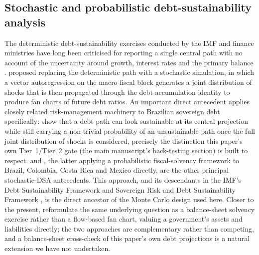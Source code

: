 \documentclass[11pt,a4paper]{article}
\begin{document}
\subsection{Stochastic and probabilistic debt-sustainability analysis}
\label{sec:lit-dsa}

The deterministic debt-sustainability exercises conducted by the IMF and finance ministries have long been criticised for reporting a single central path with no account of the uncertainty around growth, interest rates and the primary balance \citep{imf2003dsa}. \citet{celasundebrunostry2007} proposed replacing the deterministic path with a stochastic simulation, in which a vector autoregression on the macro-fiscal block generates a joint distribution of shocks that is then propagated through the debt-accumulation identity to produce fan charts of future debt ratios. An important direct antecedent applies closely related risk-management machinery to Brazilian sovereign debt specifically: \citet{garciarigobon2004} show that a debt path can look sustainable at its central projection while still carrying a non-trivial probability of an unsustainable path once the full joint distribution of shocks is considered, precisely the distinction this paper's own Tier~1/Tier~2 gate (the main manuscript's back-testing section) is built to respect. \citet{karamhostland2005,karamhostland2006} and \citet{mendozaoviedo2004}, the latter applying a probabilistic fiscal-solvency framework to Brazil, Colombia, Costa Rica and Mexico directly, are the other principal stochastic-DSA antecedents. This approach, and its descendants in the IMF's Debt Sustainability Framework \citep{imf2013mac} and Sovereign Risk and Debt Sustainability Framework \citep{imf2022srdsf}, is the direct ancestor of the Monte Carlo design used here. Closer to the present, \citet{levyyeyatisturzenegger2023} reformulate the same underlying question as a balance-sheet solvency exercise rather than a flow-based fan chart, valuing a government's assets and liabilities directly; the two approaches are complementary rather than competing, and a balance-sheet cross-check of this paper's own debt projections is a natural extension we have not undertaken.
\end{document}
